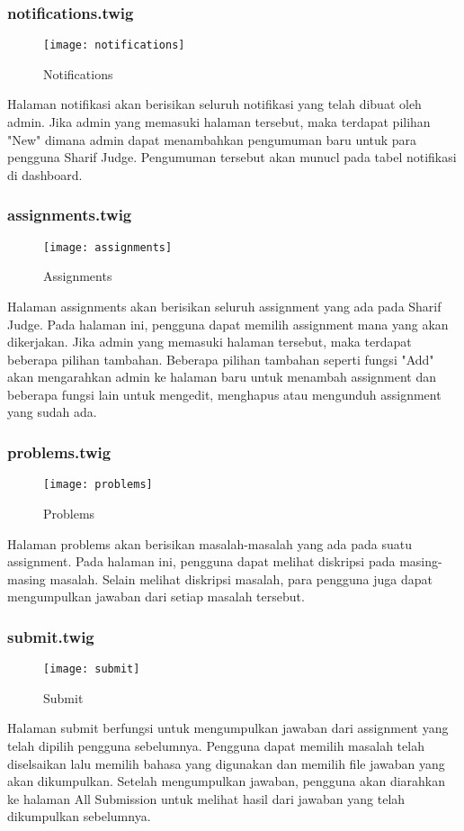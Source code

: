 \subsubsection{notifications.twig}
\begin{figure}[H]
	\centering  
	\texttt{[image: notifications]}  
	\caption[Notifications]{Notifications} 
	\label{fig:notifications} 
\end{figure} 
Halaman notifikasi akan berisikan seluruh notifikasi yang telah dibuat oleh admin. Jika admin yang memasuki halaman tersebut, maka terdapat pilihan "New" dimana admin dapat menambahkan pengumuman baru untuk para pengguna Sharif Judge. Pengumuman tersebut akan munucl pada tabel notifikasi di dashboard.

\subsubsection{assignments.twig}
\begin{figure}[H]
	\centering  
	\texttt{[image: assignments]}  
	\caption[Assignments]{Assignments} 
	\label{fig:assignments} 
\end{figure} 
Halaman assignments akan berisikan seluruh assignment yang ada pada Sharif Judge. Pada halaman ini, pengguna dapat memilih assignment mana yang akan dikerjakan. Jika admin yang memasuki halaman tersebut, maka terdapat beberapa pilihan tambahan. Beberapa pilihan tambahan seperti fungsi "Add" akan mengarahkan admin ke halaman baru untuk menambah assignment dan beberapa fungsi lain untuk mengedit, menghapus atau mengunduh assignment yang sudah ada.

\subsubsection{problems.twig}
\begin{figure}[H]
	\centering  
	\texttt{[image: problems]}  
	\caption[Problems]{Problems} 
	\label{fig:problems} 
\end{figure} 
Halaman problems akan berisikan masalah-masalah yang ada pada suatu assignment. Pada halaman ini, pengguna dapat melihat diskripsi pada masing-masing masalah. Selain melihat diskripsi masalah, para pengguna juga dapat mengumpulkan jawaban dari setiap masalah tersebut.

\subsubsection{submit.twig}
\begin{figure}[H]
	\centering  
	\texttt{[image: submit]}  
	\caption[Submit]{Submit} 
	\label{fig:submit} 
\end{figure} 
Halaman submit berfungsi untuk mengumpulkan jawaban dari assignment yang telah dipilih pengguna sebelumnya. Pengguna dapat memilih masalah telah diselsaikan lalu memilih bahasa yang digunakan dan memilih file jawaban yang akan dikumpulkan. Setelah mengumpulkan jawaban, pengguna akan diarahkan ke halaman All Submission untuk melihat hasil dari jawaban yang telah dikumpulkan sebelumnya.

